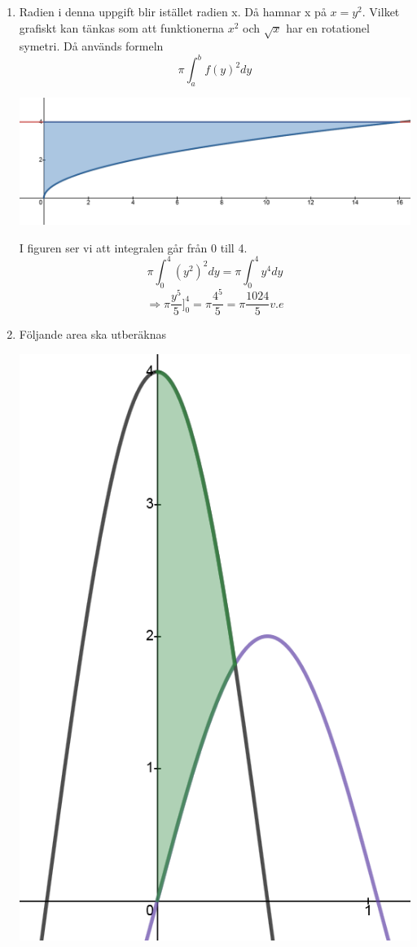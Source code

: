 \documentclass[a4paper,12pt]{article}
\begin{document}
\begin{enumerate}
    \item Radien i denna uppgift blir istället radien x. Då hamnar x på $x=y^2$.
    Vilket grafiskt kan tänkas som att funktionerna $x^2$ och $\sqrt{x}$ har en rotationel
    symetri. Då används formeln 
    $$\pi\int_a^bf(y)^2dy$$
    \begin{center}
        \includegraphics[scale=0.4]{Figur 2.png}
    \end{center}
    
    I figuren ser vi att integralen går från 0 till 4.
    $$\pi\int_0^4(y^2)^2dy=\pi\int_0^4y^4dy$$
    $$\Rightarrow \pi\frac{y^5}{5}]^4_0=\pi \frac{4^5}{5}=\pi \frac{1024}{5} v.e$$


    \item Följande area ska utberäknas
    \begin{center}
        \includegraphics[scale=0.4]{Figur 3.png}
    \end{center}


\end{enumerate}
\end{document}
